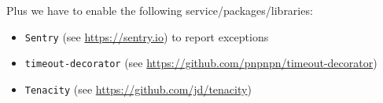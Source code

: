 Plus we have to enable the following service/packages/libraries:

\begin{itemize}
    \item \texttt{Sentry} (see \url{https://sentry.io}) to report exceptions
    \item \texttt{timeout-decorator} (see \url{https://github.com/pnpnpn/timeout-decorator})
    \item \texttt{Tenacity} (see \url{https://github.com/jd/tenacity})
\end{itemize}
